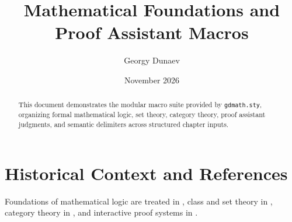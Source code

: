 \documentclass[11pt,a4paper]{article}
\title{Mathematical Foundations and Proof Assistant Macros}
\author{Georgy Dunaev}
\date{November 2026}
\begin{document}
\maketitle

\begin{abstract}
This document demonstrates the modular macro suite provided by \texttt{gdmath.sty}, organizing formal mathematical logic, set theory, category theory, proof assistant judgments, and semantic delimiters across structured chapter inputs.
\end{abstract}

\tableofcontents

\newpage







\section{Historical Context and References}
Foundations of mathematical logic are treated in \cite{mendelson2015}, class and set theory in \cite{jech2003}, category theory in \cite{maclane1998}, and interactive proof systems in \cite{nipkow2002}.



\end{document}
